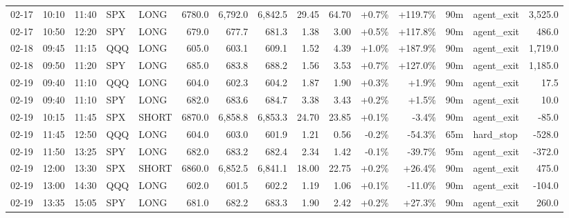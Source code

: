 \documentclass[11pt,a4paper,twoside]{article}
\begin{document}
\begin{landscape}
\begin{center}
\begin{longtable}{>{\color{txtmain}}l l l l l r r r r r r r r >{\color{txtmain}}l r}
02-17 & 10:10 & 11:40 & SPX & LONG & 6780.0 & 6,792.0 & 6,842.5 & 29.45 & 64.70 & \textcolor{wingreen}{+0.7\%} & \textcolor{wingreen}{+119.7\%} & 90m & agent\_exit & \textcolor{wingreen}{3,525.0} \\
02-17 & 10:50 & 12:20 & SPY & LONG & 679.0 & 677.7 & 681.3 & 1.38 & 3.00 & \textcolor{wingreen}{+0.5\%} & \textcolor{wingreen}{+117.8\%} & 90m & agent\_exit & \textcolor{wingreen}{486.0} \\
02-18 & 09:45 & 11:15 & QQQ & LONG & 605.0 & 603.1 & 609.1 & 1.52 & 4.39 & \textcolor{wingreen}{+1.0\%} & \textcolor{wingreen}{+187.9\%} & 90m & agent\_exit & \textcolor{wingreen}{1,719.0} \\
02-18 & 09:50 & 11:20 & SPY & LONG & 685.0 & 683.8 & 688.2 & 1.56 & 3.53 & \textcolor{wingreen}{+0.7\%} & \textcolor{wingreen}{+127.0\%} & 90m & agent\_exit & \textcolor{wingreen}{1,185.0} \\
02-19 & 09:40 & 11:10 & QQQ & LONG & 604.0 & 602.3 & 604.2 & 1.87 & 1.90 & \textcolor{wingreen}{+0.3\%} & \textcolor{wingreen}{+1.9\%} & 90m & agent\_exit & \textcolor{wingreen}{17.5} \\
02-19 & 09:40 & 11:10 & SPY & LONG & 682.0 & 683.6 & 684.7 & 3.38 & 3.43 & \textcolor{wingreen}{+0.2\%} & \textcolor{wingreen}{+1.5\%} & 90m & agent\_exit & \textcolor{wingreen}{10.0} \\
02-19 & 10:15 & 11:45 & SPX & SHORT & 6870.0 & 6,858.8 & 6,853.3 & 24.70 & 23.85 & \textcolor{wingreen}{+0.1\%} & \textcolor{lossred}{-3.4\%} & 90m & agent\_exit & \textcolor{lossred}{-85.0} \\
02-19 & 11:45 & 12:50 & QQQ & LONG & 604.0 & 603.0 & 601.9 & 1.21 & 0.56 & \textcolor{lossred}{-0.2\%} & \textcolor{lossred}{-54.3\%} & 65m & hard\_stop & \textcolor{lossred}{-528.0} \\
02-19 & 11:50 & 13:25 & SPY & LONG & 682.0 & 683.2 & 682.4 & 2.34 & 1.42 & \textcolor{lossred}{-0.1\%} & \textcolor{lossred}{-39.7\%} & 95m & agent\_exit & \textcolor{lossred}{-372.0} \\
02-19 & 12:00 & 13:30 & SPX & SHORT & 6860.0 & 6,852.5 & 6,841.1 & 18.00 & 22.75 & \textcolor{wingreen}{+0.2\%} & \textcolor{wingreen}{+26.4\%} & 90m & agent\_exit & \textcolor{wingreen}{475.0} \\
02-19 & 13:00 & 14:30 & QQQ & LONG & 602.0 & 601.5 & 602.2 & 1.19 & 1.06 & \textcolor{wingreen}{+0.1\%} & \textcolor{lossred}{-11.0\%} & 90m & agent\_exit & \textcolor{lossred}{-104.0} \\
02-19 & 13:35 & 15:05 & SPY & LONG & 681.0 & 682.2 & 683.3 & 1.90 & 2.42 & \textcolor{wingreen}{+0.2\%} & \textcolor{wingreen}{+27.3\%} & 90m & agent\_exit & \textcolor{wingreen}{260.0} \\

\end{longtable}
\end{center}
\end{landscape}
\end{document}
